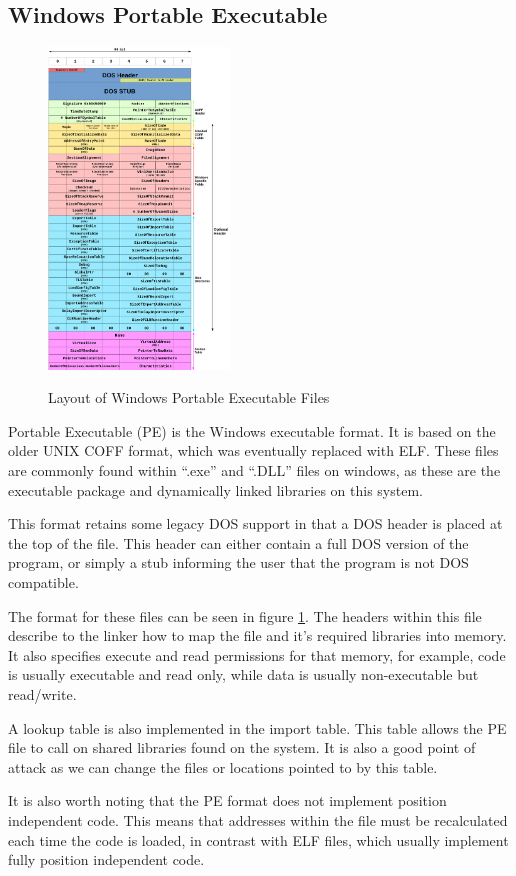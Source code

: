 		\subsection{Windows Portable Executable}
			\begin{figure}
				\includegraphics[width=0.43\textwidth]{./PE.png}
				\label{fig:PortableExecutable}
				\caption{Layout of Windows Portable Executable Files}
			\end{figure}
			Portable Executable (PE) is the Windows executable format. 
			It is based on the older UNIX COFF format, which was eventually replaced with ELF. 
			These files are commonly found within ``.exe'' and ``.DLL'' files on windows, as these are the executable 
			package and dynamically linked libraries on this system. 

			This format retains some legacy DOS support in that a DOS header is placed at the top of the file. 
			This header can either contain a full DOS version of the program, or simply a stub informing the user that the program is not DOS compatible. 

			The format for these files can be seen in figure \ref{fig:PortableExecutable}. 
			The headers within this file describe to the linker how to map the file and it's required libraries into memory. 
			It also specifies execute and read permissions for that memory, for example, code is usually executable and read only, while data is usually non-executable but read/write. 
			
			A lookup table is also implemented in the import table. 
			This table allows the PE file to call on shared libraries found on the system. 
			It is also a good point of attack as we can change the files or locations pointed to by this table. 

			It is also worth noting that the PE format does not implement position independent code. 
			This means that addresses within the file must be recalculated each time the code is loaded,
			in contrast with ELF files, which usually implement fully position independent code. 
			

